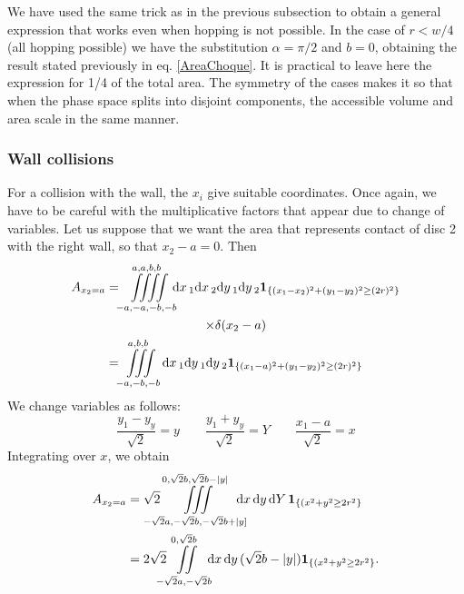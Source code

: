 \documentclass[superscriptaddress,pre,reprint,showpacs,twocolumn]{revtex4-1}
\newcommand{\rd}[1]{\mathrm{d}{#1} \,}
\newcommand{\indicatorsymbol}{\mathbf{1}}
\newcommand{\indicator}[1]{\indicatorsymbol_{ \{   #1 \} } }
\begin{document}
    We have used the same trick as in the previous subsection to obtain a general expression
    that works even when hopping is not possible.
    In the case of $r<w/4$ (all hopping possible)
    we have the substitution $\alpha=\pi/2$ and $b=0$,
    obtaining the result stated previously
    in eq. \ref{AreaChoque}. It is practical to leave here the expression for 1/4 of the
    total area. The symmetry of the cases makes it so that when the phase space splits
    into disjoint components, the accessible volume and area scale in
    the same manner.
    
    \subsubsection{Wall collisions}

    For a collision with the wall, the $x_i$ give suitable coordinates. Once again, we
    have to be careful with the multiplicative factors that appear due to change
    of variables. Let us suppose that we want the area that represents contact of
    disc 2 with the right wall, so that $x_2 - a = 0$. Then
    \begin{multline}
      A_{x_2=a}  =\iiiint \limits_{-a,-a,-b,-b}^{a,a,b,b}
       \mkern-9mu \rd x_1 \rd x_2 \rd y_1 \rd y_2 
       \indicator{(x_1-x_2)^2+(y_1-y_2)^2 \geq (2 r)^2}
       \\ \times \delta (x_2-a)\\
      =\iiint\limits _{-a,-b,-b}^{a,b,b} \rd x_1  \rd y_1 \rd y_2 
      \indicator{(x_1-a)^2+(y_1-y_2)^2 \geq (2 r)^2} 
    \end{multline}
We change variables as follows:
    \begin{equation}
      \frac{y_1-y_y}{\sqrt{2}} =  y  \qquad \frac{y_1+y_y}{\sqrt{2}}=Y \qquad \frac{x_1-a}{\sqrt{2}}=x
    \end{equation}
    Integrating over $x$, we obtain
    \begin{align}\label{areachoquexy}
      A_{x_2=a} & =\sqrt{2} \mkern-18mu
      \iiint \limits
      _{-\sqrt{2}a,-\sqrt{2}b,-\sqrt{2}b+|y]}^{0,\sqrt{2}b,\sqrt{2}b-|y|}
        \mkern-18mu \rd x \rd y \rd Y 
        \indicator{(x^2+y^2 \geq 2 r^2}
        \\
        &=2\sqrt{2}\mkern-9mu
        \iint \limits_{-\sqrt{2}a,-\sqrt{2}b}^{0,\sqrt{2}b}
        \mkern-9mu
        \rd x \rd y (\sqrt{2} b - |y|)
      \indicator{(x^2+y^2 \geq 2 r^2}.
    \end{align}
    
\end{document}
